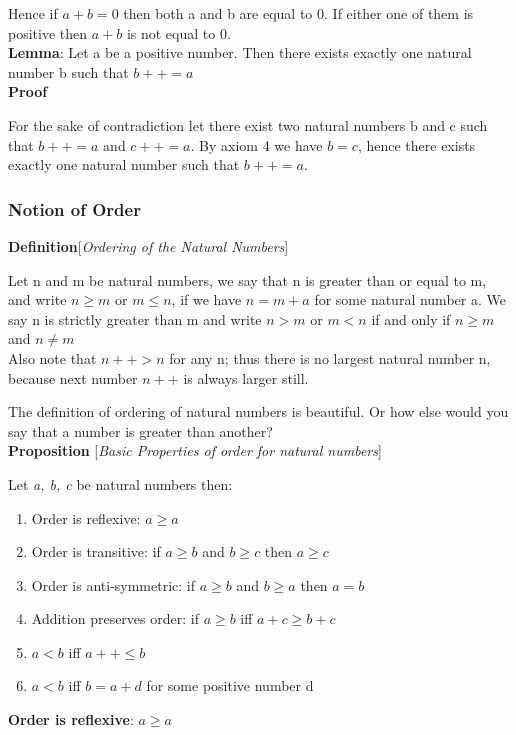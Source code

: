 \documentclass[10pt]{article}
\begin{document}
Hence if $a+b = 0$ then both a and b are equal to 0. If either one of them is
positive then $a+b$ is not equal to 0.
\\[6pt]
\textbf{Lemma}: Let a be a positive number. Then there exists exactly one
natural number b such that $b++ = a$
\\[3pt]
\textbf{Proof}

For the sake of contradiction let there exist two natural numbers b and c such
that $b++ = a$ and $c++ = a$. By axiom 4 we have $b = c$, hence there exists
exactly one natural number such that $b++ = a$.

\subsubsection*{Notion of Order}
\textbf{Definition}[\emph{Ordering of the Natural Numbers}]

  Let n and m be natural numbers, we say that n is greater than or equal to m,
  and write $n \geq m$ or $m \leq n$, if we have $n = m + a$ for some natural
  number a. We say n is strictly greater than m and write $n > m$ or $m < n$
  if and only if $n \geq m$ and $n \neq m$
  \\[6pt]
  Also note that $n++ > n$ for any n; thus there is no largest natural number n,
  because next number $n++$ is always larger still.

  The definition of ordering of natural numbers is beautiful. Or how else would
  you say that a number is greater than another?
\\[6pt]
\textbf{Proposition} [\emph{Basic Properties of order for natural numbers}]

  Let \emph{a, b, c} be natural numbers then:

  \begin{enumerate}
  \item Order is reflexive: $a \geq a$
  \item Order is transitive: if $a \geq b$ and $b \geq c$ then $a \geq c$
  \item Order is anti-symmetric: if $a \geq b$ and $b \geq a$ then $a=b$
  \item Addition preserves order: if $a \geq b$ iff $a+c \geq b+c$
  \item $a < b$ iff $a++ \leq b$
  \item $a < b$ iff $b=a+d$ for some positive number d
  \end{enumerate}

\textbf{Order is reflexive}: $a \geq a$
\end{document}
